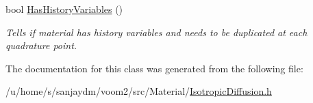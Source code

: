 \begin{DoxyCompactItemize}
\item 
\hypertarget{classvoom_1_1_isotropic_diffusion_a47882d918cb9079d91d670cbbbca5fab}{
bool \hyperlink{classvoom_1_1_isotropic_diffusion_a47882d918cb9079d91d670cbbbca5fab}{HasHistoryVariables} ()}
\label{classvoom_1_1_isotropic_diffusion_a47882d918cb9079d91d670cbbbca5fab}

\begin{DoxyCompactList}\small\item\em Tells if material has history variables and needs to be duplicated at each quadrature point. \item\end{DoxyCompactList}\end{DoxyCompactItemize}


The documentation for this class was generated from the following file:\begin{DoxyCompactItemize}
\item 
/u/home/s/sanjaydm/voom2/src/Material/\hyperlink{_isotropic_diffusion_8h}{IsotropicDiffusion.h}\end{DoxyCompactItemize}
